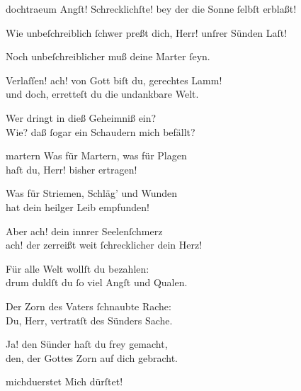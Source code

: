 \documentclass[shorttitlesize=50,tocstyle=ref-genre]{ees}
\begin{document}
{\begin{movement}{dochtraeum}
    Angſt! Schrecklichſte! bey der die Sonne ſelbſt erblaßt!\\\strut

    \voice[Lazarus]
    Wie unbeſchreiblich ſchwer preßt dich, Herr! unſrer Sünden Laſt!

    \voice[Eidli]
    Noch unbeſchreiblicher muß deine Marter ſeyn.

    Verlaſſen! ach! von Gott biſt du, gerechtes Lamm!\\
    und doch, erretteſt du die undankbare Welt.

    Wer dringt in dieß Geheimniß ein?\\
    Wie? daß ſogar ein Schaudern mich befällt?
  \end{movement}

  \begin{movement}{martern}
    \voice[Maria]
    Was für Martern, was für Plagen\\
    haſt du, Herr! bisher ertragen!

    \voice[Johannes]
    Was für Striemen, Schläg’ und Wunden\\
    hat dein heilger Leib empfunden!

    Aber ach! dein innrer Seelenſchmerz\\
    ach! der zerreißt weit ſchrecklicher dein Herz!

    \voice[Maria]
    Für alle Welt wollſt du bezahlen:\\
    drum duldſt du ſo viel Angſt und Qualen.

    \voice[Johannes]
    Der Zorn des Vaters ſchnaubte Rache:\\
    Du, Herr, vertratſt des Sünders Sache.

    Ja! den Sünder haſt du frey gemacht,\\
    den, der Gottes Zorn auf dich gebracht.
  \end{movement}

  \begin{movement}{michduerstet}
    \voice[Jeſus]
    Mich dürſtet!


\end{movement}}
\end{document}

